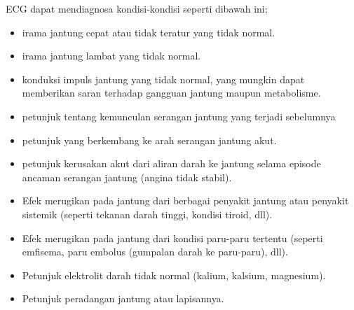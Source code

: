 \noindent ECG dapat mendiagnosa kondisi-kondisi seperti dibawah ini;
\begin{itemize}
   \item irama jantung cepat atau tidak teratur yang tidak normal.
   \item irama jantung lambat yang tidak normal.
	\item konduksi impuls jantung yang tidak normal, yang mungkin dapat memberikan
	saran terhadap gangguan jantung maupun metabolisme.
	\item petunjuk tentang kemunculan serangan jantung yang terjadi sebelumnya
	\item petunjuk yang berkembang ke arah serangan jantung akut.
	\item petunjuk kerusakan akut dari aliran darah ke  jantung selama episode
	ancaman serangan jantung (angina tidak stabil).
	\item Efek merugikan pada jantung dari berbagai  penyakit jantung atau penyakit
	sistemik (seperti tekanan darah tinggi, kondisi tiroid, dll).
	\item Efek merugikan pada jantung dari kondisi  paru-paru tertentu (seperti
	emfisema, paru embolus (gumpalan darah ke paru-paru), dll).
	\item Petunjuk elektrolit darah tidak normal (kalium, kalsium, magnesium).
	\item Petunjuk peradangan jantung atau lapisannya.
\end{itemize}


